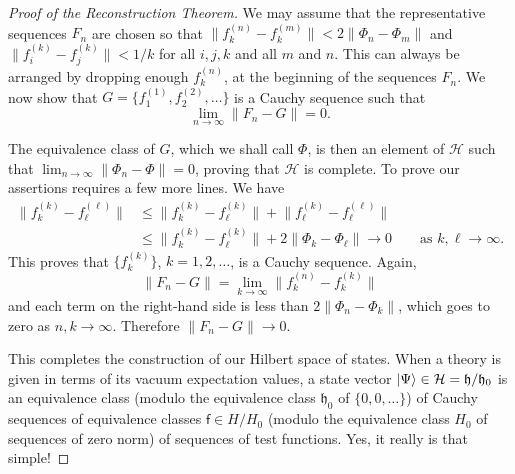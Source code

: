 \begin{proof}[Proof of the Reconstruction Theorem]
We may assume that the representative sequences \(F_n\) are chosen so that
\(\lVert f_k^{(n)}-f_k^{(m)}\rVert
<2\lVert\Phi_n-\Phi_m\rVert\) and
\(\lVert f_i^{(k)}-f_j^{(k)}\rVert<1/k\) for all \(i,j,k\) and all \(m\)
and \(n\).  This can always be arranged by dropping enough \(f_k^{(n)}\),
at the beginning of the sequences \(F_n\).  We now show that
\(G=\{f_1^{(1)},f_2^{(2)},\ldots\}\) is a Cauchy sequence such that
\begin{equation*}
\lim_{n\to\infty}\lVert F_n-G\rVert=0 .
\end{equation*}

The equivalence class of \(G\), which we shall call \(\Phi\), is then an
element of \(\mathcal H\) such that
\(\lim_{n\to\infty}\lVert\Phi_n-\Phi\rVert=0\), proving that \(\mathcal H\)
is complete.  To prove our assertions requires a few more lines.  We have
\begin{equation*}
\begin{aligned}
\lVert f_k^{(k)}-f_\ell^{(\ell)}\rVert
 &\leq \lVert f_k^{(k)}-f_\ell^{(k)}\rVert
       +\lVert f_\ell^{(k)}-f_\ell^{(\ell)}\rVert\\
 &\leq \lVert f_k^{(k)}-f_\ell^{(k)}\rVert
       +2\lVert\Phi_k-\Phi_\ell\rVert\longrightarrow 0
 \qquad\text{as }k,\ell\longrightarrow\infty .
\end{aligned}
\end{equation*}
This proves that \(\{f_k^{(k)}\}\), \(k=1,2,\ldots\), is a Cauchy sequence.
Again,
\begin{equation*}
\lVert F_n-G\rVert
 =\lim_{k\to\infty}\lVert f_k^{(n)}-f_k^{(k)}\rVert
\end{equation*}
and each term on the right-hand side is less than
\(2\lVert\Phi_n-\Phi_k\rVert\), which goes to zero as \(n,k\to\infty\).
Therefore \(\lVert F_n-G\rVert\to0\).

This completes the construction of our Hilbert space of states.  When a theory
is given in terms of its vacuum expectation values, a state vector
\(\lvert \Psi\rangle\in\mathcal H=\mathfrak h/\mathfrak h_0\) is an equivalence class
(modulo the equivalence class \(\mathfrak h_0\) of \(\{0,0,\ldots\}\)) of
Cauchy sequences of equivalence classes \(\mathsf f\in H/H_0\) (modulo the
equivalence class \(H_0\) of sequences of zero norm) of sequences of test
functions.  Yes, it really is that simple!


\end{proof}
